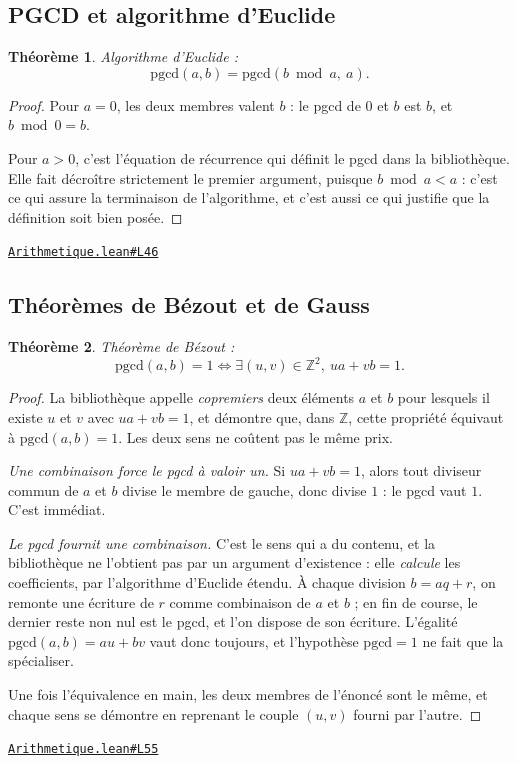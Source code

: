 \documentclass[11pt,a4paper]{article}
\theoremstyle{definition}
\theoremstyle{plain}
\newtheorem{theoreme}{Théorème}
\newcommand{\source}[2]{\par\smallskip\noindent\hfill{\footnotesize\href{#1}{\texttt{#2}}}\par\smallskip}
\begin{document}
\subsection{PGCD et algorithme d'Euclide}

\begin{theoreme}
Algorithme d'Euclide :
\[ \mathrm{pgcd}(a, b) = \mathrm{pgcd}(b \bmod a,\ a) . \]
\end{theoreme}

\begin{proof}
Pour $a = 0$, les deux membres valent $b$ : le pgcd de $0$ et $b$ est $b$, et
$b \bmod 0 = b$.

Pour $a > 0$, c'est l'équation de récurrence qui définit le pgcd dans la bibliothèque. Elle
fait décroître strictement le premier argument, puisque $b \bmod a < a$ : c'est ce qui
assure la terminaison de l'algorithme, et c'est aussi ce qui justifie que la définition
soit bien posée.
\end{proof}
\source{https://github.com/Commutator-IO/learn-lean/blob/main/courses/02-lycee/10-specialite-mathematiques-terminale-s/Arithmetique.lean\#L46}{Arithmetique.lean\#L46}

\subsection{Théorèmes de Bézout et de Gauss}

\begin{theoreme}
Théorème de Bézout :
\[ \mathrm{pgcd}(a, b) = 1 \iff \exists (u, v) \in \mathbb{Z}^{2},\ ua + vb = 1 . \]
\end{theoreme}

\begin{proof}
La bibliothèque appelle \emph{copremiers} deux éléments $a$ et $b$ pour lesquels il existe
$u$ et $v$ avec $ua + vb = 1$, et démontre que, dans $\mathbb{Z}$, cette propriété équivaut à
$\mathrm{pgcd}(a, b) = 1$. Les deux sens ne coûtent pas le même prix.

\emph{Une combinaison force le pgcd à valoir un.} Si $ua + vb = 1$, alors tout diviseur
commun de $a$ et $b$ divise le membre de gauche, donc divise $1$ : le pgcd vaut $1$. C'est
immédiat.

\emph{Le pgcd fournit une combinaison.} C'est le sens qui a du contenu, et la bibliothèque
ne l'obtient pas par un argument d'existence : elle \emph{calcule} les coefficients, par
l'algorithme d'Euclide étendu. À chaque division $b = aq + r$, on remonte une écriture de
$r$ comme combinaison de $a$ et $b$ ; en fin de course, le dernier reste non nul est le
pgcd, et l'on dispose de son écriture. L'égalité $\mathrm{pgcd}(a,b) = au + bv$ vaut donc
toujours, et l'hypothèse $\mathrm{pgcd} = 1$ ne fait que la spécialiser.

Une fois l'équivalence en main, les deux membres de l'énoncé sont le même, et chaque sens se
démontre en reprenant le couple $(u, v)$ fourni par l'autre.
\end{proof}
\source{https://github.com/Commutator-IO/learn-lean/blob/main/courses/02-lycee/10-specialite-mathematiques-terminale-s/Arithmetique.lean\#L55}{Arithmetique.lean\#L55}
\end{document}
